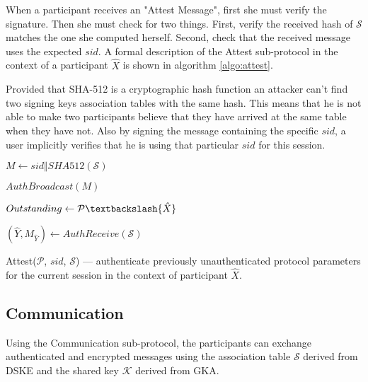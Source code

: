 When a participant receives an "Attest Message", first she must verify the signature. Then she must check for two things. First, verify the received hash of $\mathcal{S}$ matches the one she computed herself. Second, check that the received message uses the expected $sid$. A formal description of the Attest sub-protocol in the context of a participant $\hat{X}$ is shown in algorithm \ref{algo:attest}.

Provided that SHA-512 is a cryptographic hash function an attacker can't find two signing keys association tables with the same hash. This means that he is not able to make two participants believe that they have arrived at the same table when they have not. Also by signing the message containing the specific $sid$, a user implicitly verifies that he is using that particular $sid$ for this session.

\begin{algorithm}[t]
  \Begin
  {	
	$M \leftarrow sid \Vert SHA512(\mathcal{S})$
	
	$AuthBroadcast(M)$
	
	$Outstanding \leftarrow \mathcal{P} \textbackslash \{\hat{X}\}$

    {
      $(\hat{Y}, M_{\hat{Y}}) \leftarrow AuthReceive(\mathcal{S})$
      
      {     
        \Return{$\perp$}            
        
      }
    }

  }
  \caption{Attest($\mathcal{P}$, $sid$, $\mathcal{S}$) --- authenticate previously unauthenticated protocol parameters for the current session in the context of participant $\hat{X}$.}
  \label{algo:attest}
\end{algorithm}

\subsection{Communication}
\label{subsections:communication}
Using the Communication sub-protocol, the participants can exchange authenticated and encrypted messages using the association table $\mathcal{S}$ derived from DSKE and the shared key $\mathcal{K}$ derived from GKA.

